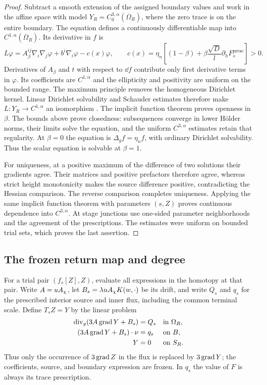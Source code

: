 \begin{proof}
Subtract a smooth extension of the assigned boundary values and work
in the affine space with model
$Y_R=C^{3,\alpha}_0(\overline\Omega_R)$, where the zero trace is on the
entire boundary.  The equation defines a continuously differentiable
map into $C^{1,\alpha}(\overline\Omega_R)$.  Its derivative in $f$ is
\[
 L\varphi=A_\beta^{ij}\nabla_i\nabla_j\varphi
          +b^i\nabla_i\varphi-c(x)\varphi,
 \qquad
 c(x)=\eta_n\left[(1-\beta)+
 \beta\frac{\sqrt D}{l}\partial_hF_s^{\mathrm{presc}}\right]>0.
\]
Derivatives of $A_\beta$ and $t$ with respect to $\dd f$ contribute
only first derivative terms in $\varphi$.  Its coefficients are
$C^{1,\alpha}$ and the ellipticity and positivity are uniform on the
bounded range.  The maximum principle removes the homogeneous
Dirichlet kernel.  Linear Dirichlet solvability and Schauder estimates
therefore make $L:Y_R\to C^{1,\alpha}$ an isomorphism
\cite{GilbargTrudinger2001}.  The implicit function theorem proves openness in
$\beta$.  The bounds above prove closedness: subsequences converge in
lower H\"older norms, their limits solve the equation, and the uniform
$C^{3,\alpha}$ estimates retain that regularity.  At $\beta=0$ the
equation is $\Delta_gf=\eta_nf$, with ordinary Dirichlet solvability.
Thus the scalar equation is solvable at $\beta=1$.

For uniqueness, at a positive maximum of the difference of two
solutions their gradients agree.  Their matrices and positive
prefactors therefore agree, whereas strict height monotonicity makes
the source difference positive, contradicting the Hessian comparison.
The reverse comparison completes uniqueness.  Applying the same
implicit function theorem with parameters $(s,Z)$ proves continuous
dependence into $C^{3,\alpha}$.  At stage junctions use one-sided
parameter neighborhoods and the agreement of the prescriptions.
The estimates were uniform on bounded trial sets, which proves the
last assertion.
\end{proof}

\subsection{The frozen return map and degree}

For a trial pair $(f_s[Z],Z)$, evaluate all expressions in the
homotopy at that pair.  Write $A=uA_\chi$, let
$B_s=\lambda uA_\chi K(w,\cdot)$ be its drift, and write $Q_s$ and $q_s$
for the prescribed interior source and inner flux, including the
common terminal scale.  Define $T_sZ=Y$ by the linear problem
\begin{equation}\label{four:ex:frozen-problem}
 \begin{aligned}
 \operatorname{div}_g(3A\operatorname{grad} Y+B_s)&=Q_s &&\hbox{in }\Omega_R,\\
 (3A\operatorname{grad} Y+B_s)\cdot\nu&=q_s &&\hbox{on }B,\\
 Y&=0 &&\hbox{on }S_R.
 \end{aligned}
\end{equation}
Thus only the occurrence of $3\operatorname{grad} Z$ in the flux is replaced by
$3\operatorname{grad} Y$; the coefficients, source, and boundary expression are
frozen.  In $q_s$ the value of $F$ is always its trace prescription.

